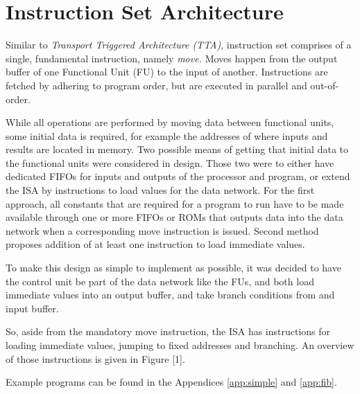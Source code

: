 	\section{Instruction Set Architecture}
		Similar to  \emph{Transport Triggered Architecture (TTA)}, instruction set
		comprises of a single, fundamental instruction, namely \textit{move.}
		Moves happen from the output buffer of one Functional Unit (FU) to the input of another.
		Instructions are fetched by adhering to program order, but are executed in parallel and out-of-order.
		
		While all operations are performed by moving data between functional units, some initial data is required, for example the addresses of where inputs and results are located in memory.
		Two possible means of getting that initial data to the functional units were considered in design.
		Those two were to either have dedicated FIFOs for inputs and outputs of the processor and program, or extend the ISA by instructions to load values for the data network.
		For the first approach, all constants that are required for a program to run have to be made available through one or more FIFOs or ROMs that outputs data into the data network when a corresponding move instruction is issued.
		Second method \cite{Schu15} proposes addition of at least one instruction to load immediate values.
		
		To make this design as simple to implement as possible, it was decided to have the control unit be part of the data network like the FUs, and both load immediate values into an output buffer, and take branch conditions from and input buffer. %
		
		So, aside from the mandatory move instruction, the ISA has instructions for loading immediate values, jumping to fixed addresses and branching.
		An overview of those instructions is given in Figure [1].%
		
		Example programs can be found in the Appendices \ref{app:simple} and \ref{app:fib}.
		
